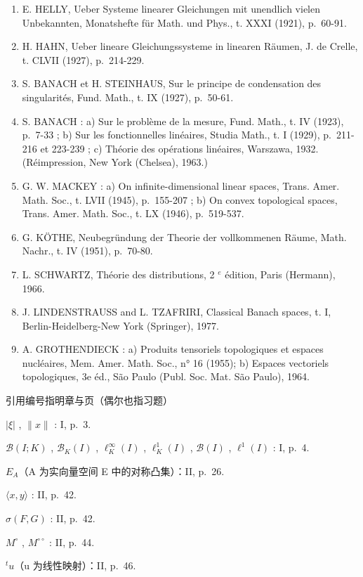 \begin{enumerate}
\item
  E. HELLY, Ueber Systeme linearer Gleichungen mit unendlich vielen Unbekannten, Monatshefte für Math. und Phys., t. XXXI (1921), p.~60-91.
\item
  H. HAHN, Ueber lineare Gleichungssysteme in linearen Räumen, J. de Crelle, t. CLVII (1927), p.~214-229.
\item
  S. BANACH et H. STEINHAUS, Sur le principe de condensation des singularités, Fund. Math., t. IX (1927), p.~50-61.
\item
  S. BANACH : a) Sur le problème de la mesure, Fund. Math., t. IV (1923), p.~7-33 ; b) Sur les fonctionnelles linéaires, Studia Math., t. I (1929), p.~211-216 et 223-239 ; c) Théorie des opérations linéaires, Warszawa, 1932. (Réimpression, New York (Chelsea), 1963.)
\item
  G. W. MACKEY : a) On infinite-dimensional linear spaces, Trans. Amer. Math. Soc., t. LVII (1945), p.~155-207 ; b) On convex topological spaces, Trans. Amer. Math. Soc., t. LX (1946), p.~519-537.
\item
  G. KÖTHE, Neubegründung der Theorie der vollkommenen Räume, Math. Nachr., t. IV (1951), p.~70-80.
\item
  L. SCHWARTZ, Théorie des distributions, 2 \(^{e}\) édition, Paris (Hermann), 1966.
\item
  J. LINDENSTRAUSS and L. TZAFRIRI, Classical Banach spaces, t. I, Berlin-Heidelberg-New York (Springer), 1977.
\item
  A. GROTHENDIECK : a) Produits tensoriels topologiques et espaces nucléaires, Mem. Amer. Math. Soc., n° 16 (1955); b) Espaces vectoriels topologiques, 3e éd., São Paulo (Publ. Soc. Mat. São Paulo), 1964.
\end{enumerate}


引用编号指明章与页（偶尔也指习题）

\(|\xi|\) , \(\|x\|\) : I, p.~3.

\(\mathcal{B}(I; K)\) , \(\mathcal{B}_{K}(I)\) , \(\ell_{K}^{\infty}(I)\) , \(\ell_{K}^{1}(I)\) , \(\mathcal{B}(I)\) , \(\ell^{1}(I)\) : I, p.~4.

\(E_{A}\)（A 为实向量空间 E 中的对称凸集）：II, p.~26.

\(\langle x, y \rangle\) : II, p.~42.

\(\sigma(F, G)\) : II, p.~42.

\(M^{\circ}\) , \(M^{\circ\circ}\) : II, p.~44.

\(^{t}u\)（u 为线性映射）：II, p.~46.

